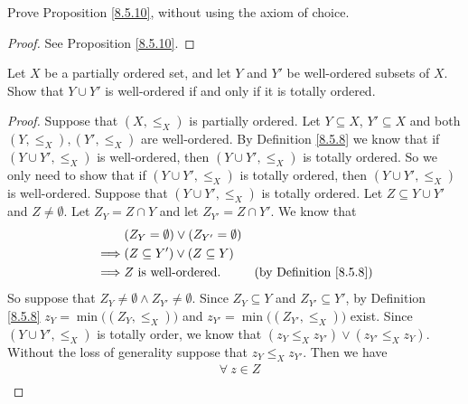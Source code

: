 \begin{exercise}\label{ex 8.5.10}
    Prove Proposition \ref{8.5.10}, without using the axiom of choice.
\end{exercise}

\begin{proof}
    See Proposition \ref{8.5.10}.
\end{proof}

\begin{exercise}\label{ex 8.5.11}
    Let \(X\) be a partially ordered set, and let \(Y\) and \(Y'\) be well-ordered subsets of \(X\).
    Show that \(Y \cup Y'\) is well-ordered if and only if it is totally ordered.
\end{exercise}

\begin{proof}
    Suppose that \((X, \leq_X)\) is partially ordered.
    Let \(Y \subseteq X\), \(Y' \subseteq X\) and both \((Y, \leq_X), (Y', \leq_X)\) are well-ordered.
    By Definition \ref{8.5.8} we know that if \((Y \cup Y', \leq_X)\) is well-ordered, then \((Y \cup Y', \leq_X)\) is totally ordered.
    So we only need to show that if \((Y \cup Y', \leq_X)\) is totally ordered, then \((Y \cup Y', \leq_X)\) is well-ordered.
    Suppose that \((Y \cup Y', \leq_X)\) is totally ordered.
    Let \(Z \subseteq Y \cup Y'\) and \(Z \neq \emptyset\).
    Let \(Z_Y = Z \cap Y\) and let \(Z_{Y'} = Z \cap Y'\).
    We know that
    \begin{align*}
                 & (Z_Y = \emptyset) \lor (Z_{Y'} = \emptyset)                                      \\
        \implies & (Z \subseteq Y') \lor (Z \subseteq Y)                                            \\
        \implies & Z \text{ is well-ordered}.                  & \text{(by Definition \ref{8.5.8})}
    \end{align*}
    So suppose that \(Z_Y \neq \emptyset \land Z_{Y'} \neq \emptyset\).
    Since \(Z_Y \subseteq Y\) and \(Z_{Y'} \subseteq Y'\), by Definition \ref{8.5.8} \(z_Y = \min\big((Z_Y, \leq_X)\big)\) and \(z_{Y'} = \min\big((Z_{Y'}, \leq_X)\big)\) exist.
    Since \((Y \cup Y', \leq_X)\) is totally order, we know that \((z_Y \leq_X z_{Y'}) \lor (z_{Y'} \leq_X z_Y)\).
    Without the loss of generality suppose that \(z_Y \leq_X z_{Y'}\).
    Then we have
    \begin{align*}
                 & \forall\ z \in Z                                                                      \\

\end{align*}
\end{proof}
